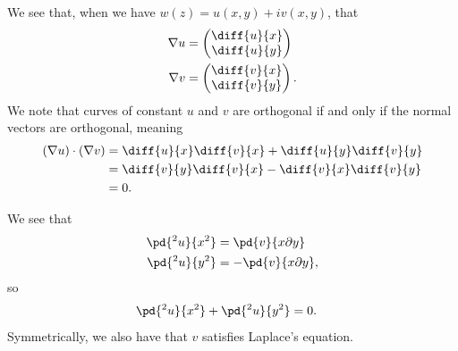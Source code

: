 \documentclass[10pt]{mypackage}
\begin{document}
\begin{solution}[18.4]
  We see that, when we have $w(z) = u(x,y) + iv(x,y)$, that
  \begin{align*}
    \nabla u &= \begin{pmatrix}\diff{u}{x} \\ \diff{u}{y}\end{pmatrix}\\
    \nabla v &= \begin{pmatrix} \diff{v}{x} \\ \diff{v}{y}\end{pmatrix}.
  \end{align*}
  We note that curves of constant $u$ and $v$ are orthogonal if and only if the normal vectors are orthogonal, meaning
  \begin{align*}
    \left( \nabla u \right)\cdot \left( \nabla v \right) &= \diff{u}{x}\diff{v}{x} + \diff{u}{y} \diff{v}{y}\\
                                                         &= \diff{v}{y}\diff{v}{x} - \diff{v}{x}\diff{v}{y}\\
                                                         &= 0.
  \end{align*}
\end{solution}
\begin{solution}[18.5]
  We see that
  \begin{align*}
    \pd{^2u}{x^2} &= \pd{v}{x\partial y}\\
    \pd{^2 u}{y^2} &= -\pd{v}{x\partial y},
  \end{align*}
  so 
  \begin{align*}
    \pd{^2u}{x^2} + \pd{^2u}{y^2} &= 0.
  \end{align*}
  Symmetrically, we also have that $v$ satisfies Laplace's equation.
\end{solution}
\end{document}

